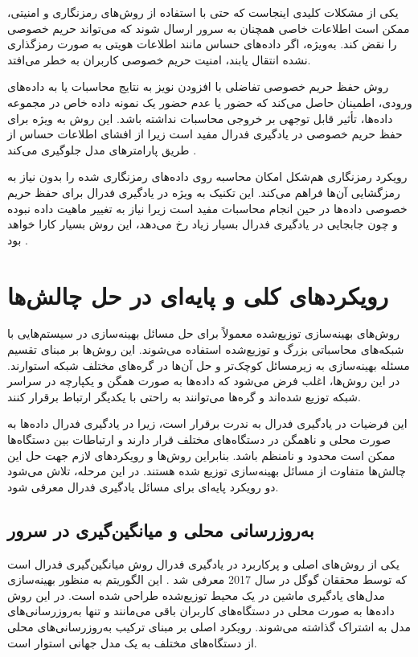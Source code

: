 یکی از مشکلات کلیدی اینجاست که حتی با استفاده از روش‌های رمزنگاری و امنیتی، ممکن است اطلاعات خاصی همچنان به سرور ارسال شوند که می‌تواند حریم خصوصی را نقض کند. به‌ویژه، اگر داده‌های حساس مانند اطلاعات هویتی به صورت رمزگذاری نشده انتقال یابند، امنیت حریم خصوصی کاربران به خطر می‌افتد.


روش حفظ حریم خصوصی تفاضلی%
با افزودن نویز به نتایج محاسبات یا به داده‌های ورودی، اطمینان حاصل می‌کند که حضور یا عدم حضور یک نمونه داده خاص در مجموعه داده‌ها، تأثیر قابل توجهی بر خروجی محاسبات نداشته باشد. این روش به ویژه برای حفظ حریم خصوصی در یادگیری فدرال مفید است زیرا از افشای اطلاعات حساس از طریق پارامترهای مدل جلوگیری می‌کند
\cite{hasan2023security}.

رویکرد رمزنگاری هم‌شکل%
امکان محاسبه روی داده‌های رمزنگاری شده را بدون نیاز به رمزگشایی آن‌ها فراهم می‌کند. این تکنیک به ویژه در یادگیری فدرال برای حفظ حریم خصوصی داده‌ها در حین انجام محاسبات مفید است زیرا نیاز به تغییر ماهیت داده نبوده و چون جابجایی در یادگیری فدرال بسیار زیاد رخ می‌دهد، این روش بسیار کارا خواهد بود
\cite{yin2021comprehensive}.



\section{رویکردهای کلی و پایه‌ای در حل چالش‌ها}
روش‌های بهینه‌سازی توزیع‌شده معمولاً برای حل مسائل بهینه‌سازی در سیستم‌هایی با شبکه‌های محاسباتی بزرگ و توزیع‌شده استفاده می‌شوند. این روش‌ها بر مبنای تقسیم مسئله بهینه‌سازی به زیرمسائل کوچک‌تر و حل آن‌ها در گره‌های مختلف شبکه استوارند. در این روش‌ها، اغلب فرض می‌شود که داده‌ها به صورت همگن و یکپارچه در سراسر شبکه توزیع شده‌اند و گره‌ها می‌توانند به راحتی با یکدیگر ارتباط برقرار کنند.

این فرضیات در یادگیری فدرال به ندرت برقرار است، زیرا در یادگیری فدرال داده‌ها به صورت محلی و ناهمگن در دستگاه‌های مختلف قرار دارند و ارتباطات بین دستگاه‌ها ممکن است محدود و نامنظم باشد. بنابراین روش‌ها و رویکردهای لازم جهت حل این چالش‌ها متفاوت از مسائل بهینه‌سازی توزیع شده هستند. در این مرحله، تلاش می‌شود دو رویکرد پایه‌ای برای مسائل یادگیری فدرال معرفی شود.

\subsection{به‌روزرسانی محلی و میانگین‌گیری در سرور}
یکی از روش‌های اصلی و پرکاربرد در یادگیری فدرال روش میانگین‌گیری فدرال%
است که توسط محققان گوگل در سال 2017 معرفی شد
\cite{mcmahan2017communication}.
این الگوریتم به منظور بهینه‌سازی مدل‌های یادگیری ماشین در یک محیط توزیع‌شده طراحی شده است. در این روش داده‌ها به صورت محلی در دستگاه‌های کاربران باقی می‌مانند و تنها به‌روزرسانی‌های مدل به اشتراک گذاشته می‌شوند. رویکرد اصلی
بر مبنای ترکیب به‌روزرسانی‌های محلی از دستگاه‌های مختلف به یک مدل جهانی استوار است.

